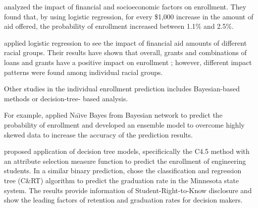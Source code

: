 \documentclass[12pt,english]{report}
\begin{document}
\citet{Braunstein1999} analyzed the impact of financial and socioeconomic factors on  enrollment. They found that, by using logistic regression, for every \$1,000 increase  in the amount of aid offered, the probability of enrollment increased between 1.1\% and  2.5\%.

\citet{lr_aid2} applied logistic regression to see the impact of financial aid amounts  of different racial groups. Their results have shown that overall, grants and  combinations of loans and grants have a positive impact on enrollment ; however, different impact patterns were  found among individual racial groups.



Other studies in the individual enrollment prediction includes Bayesian-based methods or decision-tree- based analysis.  

For example, \citet{Thanh2007} applied Na{\"\i}ve Bayes  from Bayesian network to predict the probability of enrollment and developed  an ensemble model to overcome highly skewed data to increase the accuracy of  the prediction results. 

\citet{dt_enroll_india} proposed application of decision tree models, specificically the C4.5 method with an attribute selection measure function to predict the enrollment of engineering students. %
In a similar binary prediction, \citet{Bailey2006} chose the classification and regression tree (C\&RT) algorithm to predict the graduation rate in the Minnesota state system. The results provide information of Student-Right-to-Know disclosure and show the leading factors of retention and graduation rates for decision makers.


\end{document}
